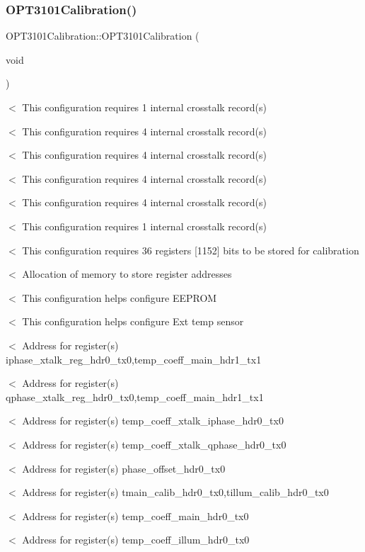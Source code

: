 \subsubsection{\texorpdfstring{O\+P\+T3101\+Calibration()}{OPT3101Calibration()}}
{\footnotesize\ttfamily O\+P\+T3101\+Calibration\+::\+O\+P\+T3101\+Calibration (\begin{DoxyParamCaption}\item[{void}]{ }\end{DoxyParamCaption})}

$<$ This configuration requires 1 internal crosstalk record(s)

$<$ This configuration requires 4 internal crosstalk record(s)

$<$ This configuration requires 4 internal crosstalk record(s)

$<$ This configuration requires 4 internal crosstalk record(s)

$<$ This configuration requires 4 internal crosstalk record(s)

$<$ This configuration requires 1 internal crosstalk record(s)

$<$ This configuration requires 36 registers \mbox{[}1152\mbox{]} bits to be stored for calibration

$<$ Allocation of memory to store register addresses

$<$ This configuration helps configure E\+E\+P\+R\+OM

$<$ This configuration helps configure Ext temp sensor

$<$ Address for register(s) iphase\+\_\+xtalk\+\_\+reg\+\_\+hdr0\+\_\+tx0,temp\+\_\+coeff\+\_\+main\+\_\+hdr1\+\_\+tx1

$<$ Address for register(s) qphase\+\_\+xtalk\+\_\+reg\+\_\+hdr0\+\_\+tx0,temp\+\_\+coeff\+\_\+main\+\_\+hdr1\+\_\+tx1

$<$ Address for register(s) temp\+\_\+coeff\+\_\+xtalk\+\_\+iphase\+\_\+hdr0\+\_\+tx0

$<$ Address for register(s) temp\+\_\+coeff\+\_\+xtalk\+\_\+qphase\+\_\+hdr0\+\_\+tx0

$<$ Address for register(s) phase\+\_\+offset\+\_\+hdr0\+\_\+tx0

$<$ Address for register(s) tmain\+\_\+calib\+\_\+hdr0\+\_\+tx0,tillum\+\_\+calib\+\_\+hdr0\+\_\+tx0

$<$ Address for register(s) temp\+\_\+coeff\+\_\+main\+\_\+hdr0\+\_\+tx0

$<$ Address for register(s) temp\+\_\+coeff\+\_\+illum\+\_\+hdr0\+\_\+tx0

